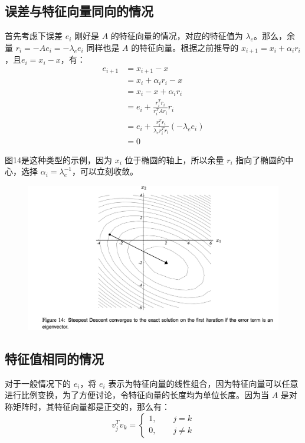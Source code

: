 \documentclass[12pt]{article}
\begin{document}
\subsection{误差与特征向量同向的情况}
首先考虑下误差 $e_i$ 刚好是 $A$ 的特征向量的情况，对应的特征值为 $\lambda_e$。那么，余量 $r_i = -Ae_i = -\lambda_ee_i$ 同样也是 $A$ 的特征向量。根据之前推导的 $x_{i+1} = x_i + \alpha_i r_i$，且$e_i = x_i - x$，有：
\begin{align*}
e_{i+1} &= x_{i+1} - x \\
	   &= x_i + \alpha_ir_i - x \\
	   &= x_i - x + \alpha_ir_i \\
	   &= e_i + \frac{r^T_ir_i}{r^T_iAr_i}r_i  \\
	   &= e_i + \frac{r^T_ir_i}{\lambda_er^T_ir_i}(-\lambda_ee_i) \\
	   &= 0
\end{align*}

图14是这种类型的示例，因为 $x_i$ 位于椭圆的轴上，所以余量 $r_i$ 指向了椭圆的中心，选择 $\alpha_i = \lambda^{-1}_e$，可以立刻收敛。
\begin{figure}[H]
    \centering
    \includegraphics[width=1\textwidth]{fig/CG_Convergence_SD_1.png}
\end{figure}

\subsection{特征值相同的情况}
对于一般情况下的 $e_i$，将 $e_i$ 表示为特征向量的线性组合，因为特征向量可以任意进行比例变换，为了方便讨论，令特征向量的长度均为单位长度。因为当 $A$ 是对称矩阵时，其特征向量都是正交的，那么有：
$$
v_j^Tv_k = \begin{cases} 1, \qquad j = k \\ 0, \qquad j \neq k \end{cases}
$$
\end{document}
